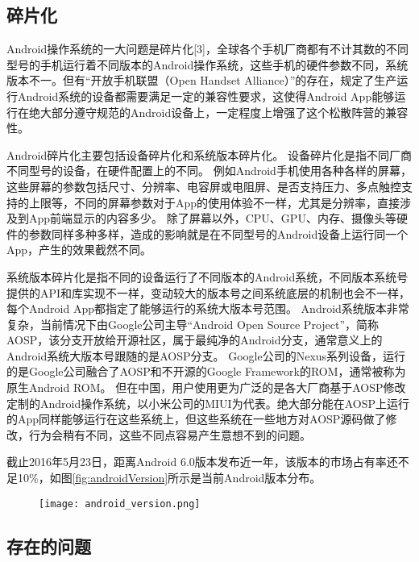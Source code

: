 \subsection{碎片化}

Android操作系统的一大问题是碎片化[3]，全球各个手机厂商都有不计其数的不同型号的手机运行着不同版本的Android操作系统，这些手机的硬件参数不同，系统版本不一。但有“开放手机联盟（Open Handset Alliance）”的存在，规定了生产运行Android系统的设备都需要满足一定的兼容性要求，这使得Android App能够运行在绝大部分遵守规范的Android设备上，一定程度上增强了这个松散阵营的兼容性。

Android碎片化主要包括设备碎片化和系统版本碎片化。
设备碎片化是指不同厂商不同型号的设备，在硬件配置上的不同。
例如Android手机使用各种各样的屏幕，这些屏幕的参数包括尺寸、分辨率、电容屏或电阻屏、是否支持压力、多点触控支持的上限等，不同的屏幕参数对于App的使用体验不一样，尤其是分辨率，直接涉及到App前端显示的内容多少。
除了屏幕以外，CPU、GPU、内存、摄像头等硬件的参数同样多种多样，造成的影响就是在不同型号的Android设备上运行同一个App，产生的效果截然不同。

系统版本碎片化是指不同的设备运行了不同版本的Android系统，不同版本系统号提供的API和库实现不一样，变动较大的版本号之间系统底层的机制也会不一样，每个Android App都指定了能够运行的系统大版本号范围。
Android系统版本非常复杂，当前情况下由Google公司主导“Android Open Source Project”，简称AOSP，该分支开放给开源社区，属于最纯净的Android分支，通常意义上的Android系统大版本号跟随的是AOSP分支。
Google公司的Nexus系列设备，运行的是Google公司融合了AOSP和不开源的Google Framework的ROM，通常被称为原生Android ROM。
但在中国，用户使用更为广泛的是各大厂商基于AOSP修改定制的Android操作系统，以小米公司的MIUI为代表。绝大部分能在AOSP上运行的App同样能够运行在这些系统上，但这些系统在一些地方对AOSP源码做了修改，行为会稍有不同，这些不同点容易产生意想不到的问题。

截止2016年5月23日，距离Android 6.0版本发布近一年，该版本的市场占有率还不足10\%，如图\ref{fig:androidVersion}所示是当前Android版本分布。

\begin{figure}[!htp]
	\centering
	\texttt{[image: android\_version.png]}
\end{figure}

\subsection{存在的问题}
\label{subsec:exist_problem}

